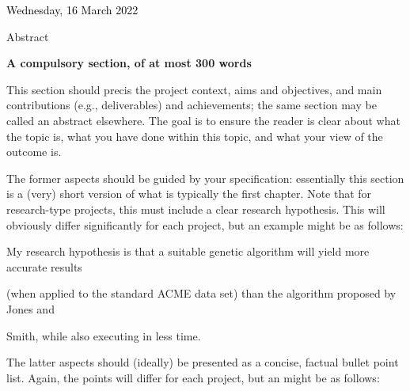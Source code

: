 \documentclass[a4paper]{article}
\begin{document}
{\par}

\bigskip


\bigskip

{\centering
\textcolor{black}{Wednesday, 16 March 2022}
\par}


\bigskip

\clearpage
\bigskip

Abstract


\bigskip


\bigskip

\textbf{A compulsory section, of at most 300 words}


\bigskip


\bigskip

This section should precis the project context, aims and objectives, and main contributions (e.g., deliverables) and
achievements; the same section may be called an abstract elsewhere. The goal is to ensure the reader is clear about
what the topic is, what you have done within this topic, and what your view of the outcome is.


\bigskip

The former aspects should be guided by your specification: essentially this section is a (very) short version of what is
typically the first chapter. Note that for research-type projects, this must include a clear research hypothesis. This
will obviously differ significantly for each project, but an example might be as follows:


\bigskip

My research hypothesis is that a suitable genetic algorithm will yield more accurate results

(when applied to the standard ACME data set) than the algorithm proposed by Jones and

Smith, while also executing in less time.


\bigskip

The latter aspects should (ideally) be presented as a concise, factual bullet point list. Again, the points will differ
for each project, but an might be as follows:


\bigskip
\end{document}

